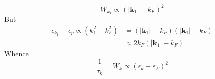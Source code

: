 \begin{equation}W_{k_{1}} \propto\left(\left|\mathbf{k}_{1}\right|-k_{F}\right)^{2}\end{equation}
But
\begin{equation}\begin{aligned}
\epsilon_{k_{1}}-\epsilon_{p} \propto\left(k_{1}^{2}-k_{F}^{2}\right) &=\left(\left|\mathbf{k}_{1}\right|-k_{P}\right)\left(\left|\mathbf{k}_{1}\right|+k_{F}\right) \\
& \approx 2 k_{F}\left(\left|\mathbf{k}_{1}\right|-k_{F}\right)
\end{aligned}\end{equation}
Whence
\begin{equation}\frac{1}{\tau_{k}}=W_{k} \propto\left(\epsilon_{k}-\epsilon_{F}\right)^{2}\end{equation}

